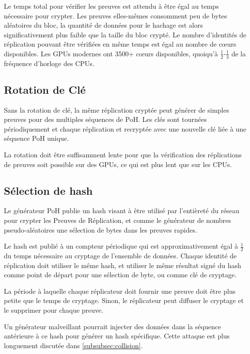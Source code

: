 \documentclass[12pt]{article}
\begin{document}
Le temps total pour vérifier les preuves est attendu à être égal au temps nécessaire pour crypter. Les preuves elles-mêmes consomment peu de bytes aléatoires du bloc, la quantité de données pour le hachage est alors significativement plus faible que la taille du bloc crypté. Le nombre d’identités de réplication pouvant être vérifiées en même temps est égal au nombre de cœurs disponibles. Les GPUs modernes ont 3500+ cœurs disponibles, quoiqu’à \(\frac{1}{2}\)-\(\frac{1}{3}\) de la fréquence d’horloge des CPUs.

\subsection{Rotation de Clé}

Sans la rotation de clé, la même réplication cryptée peut générer de simples preuves pour des multiples séquences de PoH. Les clés sont tournées périodiquement et chaque réplication et recryptée avec une nouvelle clé liée à une séquence PoH unique.

La rotation doit être suffisamment lente pour que la vérification des réplications de preuves soit possible sur des GPUs, ce qui est plus lent que sur les CPUs.

\subsection{Sélection de hash}\label{selectiondehash}

Le générateur PoH publie un hash visant à être utilisé par l’entièreté du réseau pour crypter les Preuves de Réplication, et comme le générateur de nombres pseudo-aléatoires une sélection de bytes dans les preuves rapides.

Le hash est publié à un compteur périodique qui est approximativement égal à \(\frac{1}{2}\) du temps nécessaire au cryptage de l’ensemble de données. Chaque identité de réplication doit utiliser le même hash, et utiliser le même résultat signé du hash comme point de départ pour une sélection de byte, ou comme clé de cryptage.

La période à laquelle chaque réplicateur doit fournir une preuve doit être plus petite que le temps de cryptage. Sinon, le réplicateur peut diffuser le cryptage et le supprimer pour chaque preuve.

Un générateur malveillant pourrait injecter des données dans la séquence antérieure à ce hash pour générer un hash spécifique. Cette attaque est plus longuement discutée dans \ref{subsubsec:collision}.
\end{document}
